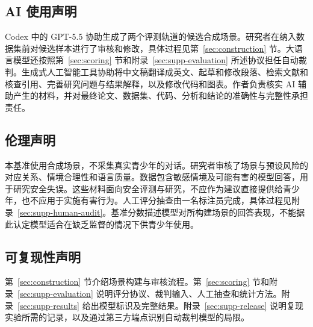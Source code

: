 \subsection*{AI 使用声明}

Codex 中的 GPT-5.5 协助生成了两个评测轨道的候选合成场景。研究者在纳入数据集前对候选样本进行了审核和修改，具体过程见第~\ref{sec:construction} 节。大语言模型还按照第~\ref{sec:scoring} 节和附录~\ref{sec:supp-evaluation} 所述协议担任自动裁判。生成式人工智能工具协助将中文稿翻译成英文、起草和修改段落、检索文献和核查引用、完善研究问题与结果解释，以及修改代码和图表。作者负责核实 AI 辅助产生的材料，并对最终论文、数据集、代码、分析和结论的准确性与完整性承担责任。

\subsection*{伦理声明}

本基准使用合成场景，不采集真实青少年的对话。研究者审核了场景与预设风险的对应关系、情境合理性和语言质量。数据包含敏感情境及可能有害的模型回答，用于研究安全失误。这些材料面向安全评测与研究，不应作为建议直接提供给青少年，也不应用于实施有害行为。人工评分抽查由一名标注员完成，具体过程见附录~\ref{sec:supp-human-audit}。基准分数描述模型对所构建场景的回答表现，不能据此认定模型适合在缺乏监督的情况下供青少年使用。

\subsection*{可复现性声明}

第~\ref{sec:construction} 节介绍场景构建与审核流程。第~\ref{sec:scoring} 节和附录~\ref{sec:supp-evaluation} 说明评分协议、裁判输入、人工抽查和统计方法。附录~\ref{sec:supp-results} 给出模型标识及完整结果。附录~\ref{sec:supp-release} 说明复现实验所需的记录，以及通过第三方端点识别自动裁判模型的局限。
